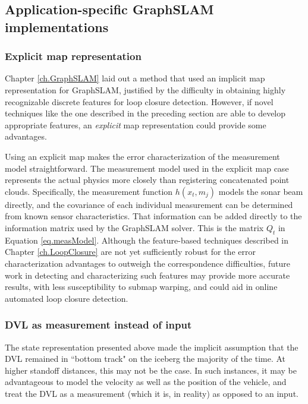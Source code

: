 \subsection{Application-specific GraphSLAM implementations}
\label{sec.DesignConsiderations}
\subsubsection{Explicit map representation}

Chapter \ref{ch.GraphSLAM} laid out a method that used an implicit map representation for GraphSLAM, justified by the difficulty in obtaining highly recognizable discrete features for loop closure detection. However, if novel techniques like the one described in the preceding section are able to develop appropriate features, an \emph{explicit} map representation could provide some advantages. 

Using an explicit map makes the error characterization of the measurement model straightforward. The measurement model used in the explicit map case represents the actual physics more closely than registering concatenated point clouds. Specifically, the measurement function $h\left(x_t,m_j\right)$ models the sonar beam directly, and the covariance of each individual measurement can be determined from known sensor characteristics. That information can be added directly to the information matrix used by the GraphSLAM solver. This is the matrix $Q_t$ in Equation \ref{eq.measModel}. Although the feature-based techniques described in Chapter \ref{ch.LoopClosure} are not yet sufficiently robust for the error characterization advantages to outweigh the correspondence difficulties, future work in detecting and characterizing such features may provide more accurate results, with less susceptibility to submap warping, and could aid in online automated loop closure detection. 

\subsubsection{DVL as measurement instead of input}
\label{sec.VelocityState}

The state representation presented above made the implicit assumption that the DVL remained in ``bottom track" on the iceberg the majority of the time. At higher standoff distances, this may not be the case. In such instances, it may be advantageous to model the velocity as well as the position of the vehicle, and treat the DVL as a measurement (which it is, in reality) as opposed to an input.

